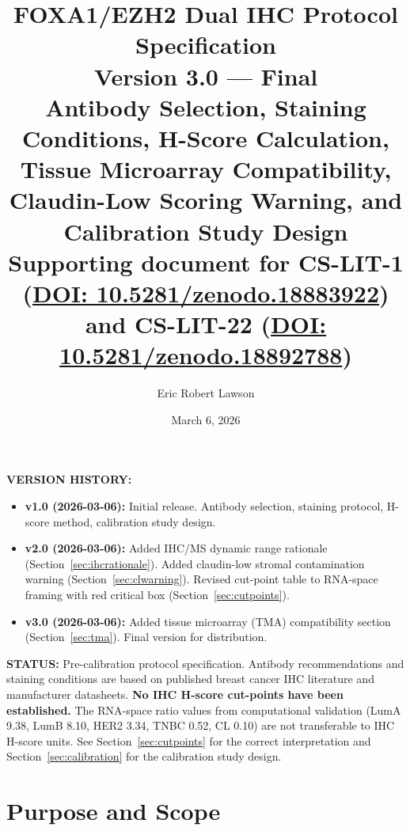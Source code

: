 \documentclass[11pt, a4paper]{article}
\title{
    \vspace{-1em}
    \textbf{FOXA1/EZH2 Dual IHC Protocol
    Specification}\\[0.5em]
    \large Version 3.0 --- Final\\[0.4em]
    \normalsize Antibody Selection, Staining
    Conditions, H-Score Calculation, Tissue
    Microarray Compatibility, Claudin-Low
    Scoring Warning, and Calibration Study
    Design\\[0.3em]
    \small Supporting document for CS-LIT-1
    (\href{https://doi.org/10.5281/zenodo.18883922}
    {DOI: 10.5281/zenodo.18883922}) and
    CS-LIT-22
    (\href{https://doi.org/10.5281/zenodo.18892788}
    {DOI: 10.5281/zenodo.18892788})
}
\author[1]{Eric Robert Lawson}
\affil[1]{OrganismCore \textbar{}
    \href{mailto:OrganismCore@proton.me}
    {OrganismCore@proton.me} \textbar{}
    ORCID: 0009-0002-0414-6544}
\date{March 6, 2026}
\begin{document}
\maketitle
\thispagestyle{fancy}

\begin{mdframed}[backgroundcolor=infobox,
                 linecolor=blue!50!black,
                 linewidth=1pt]
\textbf{VERSION HISTORY:}
\begin{itemize}[noitemsep]
    \item \textbf{v1.0 (2026-03-06):}
    Initial release. Antibody selection,
    staining protocol, H-score method,
    calibration study design.
    \item \textbf{v2.0 (2026-03-06):}
    Added IHC/MS dynamic range rationale
    (Section~\ref{sec:ihcrationale}).
    Added claudin-low stromal contamination
    warning (Section~\ref{sec:clwarning}).
    Revised cut-point table to RNA-space
    framing with red critical box
    (Section~\ref{sec:cutpoints}).
    \item \textbf{v3.0 (2026-03-06):}
    Added tissue microarray (TMA) compatibility
    section (Section~\ref{sec:tma}).
    Final version for distribution.
\end{itemize}
\end{mdframed}

\vspace{0.4em}

\begin{mdframed}[backgroundcolor=warningbox,
                 linecolor=orange!70!black,
                 linewidth=1pt]
\textbf{STATUS:} Pre-calibration protocol
specification. Antibody recommendations and
staining conditions are based on published
breast cancer IHC literature and manufacturer
datasheets. \textbf{No IHC H-score cut-points
have been established.} The RNA-space ratio
values from computational validation (LumA
9.38, LumB 8.10, HER2 3.34, TNBC 0.52, CL
0.10) are not transferable to IHC H-score
units. See Section~\ref{sec:cutpoints} for
the correct interpretation and
Section~\ref{sec:calibration} for the
calibration study design.
\end{mdframed}

\vspace{0.5em}
\tableofcontents
\newpage

\section{Purpose and Scope}
\end{document}
